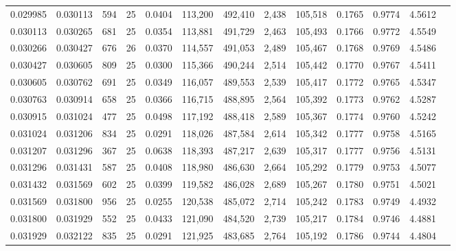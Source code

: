 \begin{tabular}{rrrrrrrrrrrrr}
0.029985 & 0.030113 &   594 &  25 &                                     0.0404 & 113,200 & 492,410 &   2,438 & 105,518 & 0.1765 & 0.9774 & 4.5612 \\
0.030113 & 0.030265 &   681 &  25 &                                     0.0354 & 113,881 & 491,729 &   2,463 & 105,493 & 0.1766 & 0.9772 & 4.5549 \\
0.030266 & 0.030427 &   676 &  26 &                                     0.0370 & 114,557 & 491,053 &   2,489 & 105,467 & 0.1768 & 0.9769 & 4.5486 \\
0.030427 & 0.030605 &   809 &  25 &                                     0.0300 & 115,366 & 490,244 &   2,514 & 105,442 & 0.1770 & 0.9767 & 4.5411 \\
0.030605 & 0.030762 &   691 &  25 &                                     0.0349 & 116,057 & 489,553 &   2,539 & 105,417 & 0.1772 & 0.9765 & 4.5347 \\
0.030763 & 0.030914 &   658 &  25 &                                     0.0366 & 116,715 & 488,895 &   2,564 & 105,392 & 0.1773 & 0.9762 & 4.5287 \\
0.030915 & 0.031024 &   477 &  25 &                                     0.0498 & 117,192 & 488,418 &   2,589 & 105,367 & 0.1774 & 0.9760 & 4.5242 \\
0.031024 & 0.031206 &   834 &  25 &                                     0.0291 & 118,026 & 487,584 &   2,614 & 105,342 & 0.1777 & 0.9758 & 4.5165 \\
0.031207 & 0.031296 &   367 &  25 &                                     0.0638 & 118,393 & 487,217 &   2,639 & 105,317 & 0.1777 & 0.9756 & 4.5131 \\
0.031296 & 0.031431 &   587 &  25 &                                     0.0408 & 118,980 & 486,630 &   2,664 & 105,292 & 0.1779 & 0.9753 & 4.5077 \\
0.031432 & 0.031569 &   602 &  25 &                                     0.0399 & 119,582 & 486,028 &   2,689 & 105,267 & 0.1780 & 0.9751 & 4.5021 \\
0.031569 & 0.031800 &   956 &  25 &                                     0.0255 & 120,538 & 485,072 &   2,714 & 105,242 & 0.1783 & 0.9749 & 4.4932 \\
0.031800 & 0.031929 &   552 &  25 &                                     0.0433 & 121,090 & 484,520 &   2,739 & 105,217 & 0.1784 & 0.9746 & 4.4881 \\
0.031929 & 0.032122 &   835 &  25 &                                     0.0291 & 121,925 & 483,685 &   2,764 & 105,192 & 0.1786 & 0.9744 & 4.4804 \\

\end{tabular}
